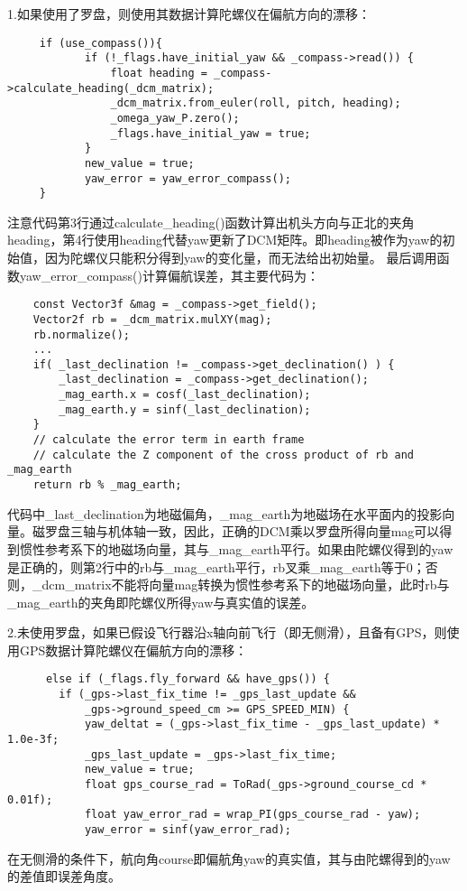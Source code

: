 \documentclass[a4paper,10pt]{ctexart} %
\begin{document}
1.如果使用了罗盘，则使用其数据计算陀螺仪在偏航方向的漂移：
\begin{lstlisting}
     if (use_compass()){
            if (!_flags.have_initial_yaw && _compass->read()) {
                float heading = _compass->calculate_heading(_dcm_matrix);
                _dcm_matrix.from_euler(roll, pitch, heading);
                _omega_yaw_P.zero();
                _flags.have_initial_yaw = true;
            }
            new_value = true;
            yaw_error = yaw_error_compass();
     }
\end{lstlisting}
注意代码第3行通过calculate\_heading()函数计算出机头方向与正北的夹角heading，第4行使用heading代替yaw更新了DCM矩阵。即heading被作为yaw的初始值，因为陀螺仪只能积分得到yaw的变化量，而无法给出初始量。
最后调用函数yaw\_error\_compass()计算偏航误差，其主要代码为：
\begin{lstlisting}
    const Vector3f &mag = _compass->get_field();
    Vector2f rb = _dcm_matrix.mulXY(mag);
    rb.normalize();
    ...
    if( _last_declination != _compass->get_declination() ) {
        _last_declination = _compass->get_declination();
        _mag_earth.x = cosf(_last_declination);
        _mag_earth.y = sinf(_last_declination);
    }
    // calculate the error term in earth frame
    // calculate the Z component of the cross product of rb and _mag_earth
    return rb % _mag_earth;
\end{lstlisting}
\noindent 代码中\_last\_declination为地磁偏角，\_mag\_earth为地磁场在水平面内的投影向量。磁罗盘三轴与机体轴一致，因此，正确的DCM乘以罗盘所得向量mag可以得到惯性参考系下的地磁场向量，其与\_mag\_earth平行。如果由陀螺仪得到的yaw是正确的，则第2行中的rb与\_mag\_earth平行，rb叉乘\_mag\_earth等于0；否则，\_dcm\_matrix不能将向量mag转换为惯性参考系下的地磁场向量，此时rb与\_mag\_earth的夹角即陀螺仪所得yaw与真实值的误差。

2.未使用罗盘，如果已假设飞行器沿x轴向前飞行（即无侧滑），且备有GPS，则使用GPS数据计算陀螺仪在偏航方向的漂移：
\begin{lstlisting}
      else if (_flags.fly_forward && have_gps()) { 
        if (_gps->last_fix_time != _gps_last_update &&
            _gps->ground_speed_cm >= GPS_SPEED_MIN) {
            yaw_deltat = (_gps->last_fix_time - _gps_last_update) * 1.0e-3f;
            _gps_last_update = _gps->last_fix_time;
            new_value = true;
            float gps_course_rad = ToRad(_gps->ground_course_cd * 0.01f);
            float yaw_error_rad = wrap_PI(gps_course_rad - yaw);
            yaw_error = sinf(yaw_error_rad);
\end{lstlisting}
在无侧滑的条件下，航向角course即偏航角yaw的真实值，其与由陀螺得到的yaw的差值即误差角度。
\end{document}
